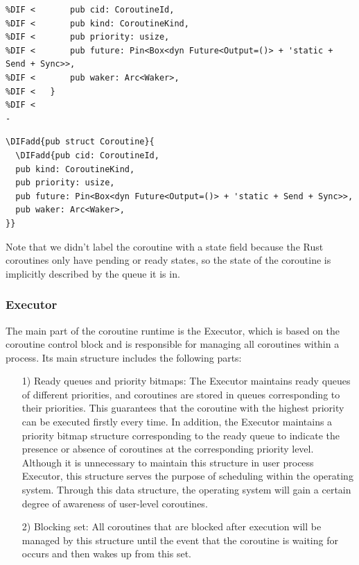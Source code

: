 \documentclass[sigconf,review,anonymous]{acmart}
\providecommand{\DIFadd}[1]{{\protect\color{blue}\uwave{#1}}} %
\providecommand{\DIFaddbegin}{} %
\providecommand{\DIFaddend}{} %
\providecommand{\DIFdelbegin}{} %
\providecommand{\DIFdelend}{} %
\providecommand{\DIFmodbegin}{} %
\providecommand{\DIFmodend}{} %
\begin{document}
\DIFdelbegin %
\DIFmodbegin
\begin{lstlisting}[label={ccb},caption={Coroutine control block},alsolanguage=DIFcode]
%DIF <   pub struct Coroutine{
%DIF <       pub cid: CoroutineId,
%DIF <       pub kind: CoroutineKind,
%DIF <       pub priority: usize,
%DIF <       pub future: Pin<Box<dyn Future<Output=()> + 'static + Send + Sync>>, 
%DIF <       pub waker: Arc<Waker>,
%DIF <   }
%DIF <   
-\end{lstlisting}
\DIFmodend %
\DIFdelend \DIFaddbegin \begin{listing}
\caption{\DIFadd{Coroutine control block.}}
\label{ccb}
\begin{mdframed}
\begin{verbatim}
\DIFadd{pub struct Coroutine}{
  \DIFadd{pub cid: CoroutineId,
  pub kind: CoroutineKind,
  pub priority: usize,
  pub future: Pin<Box<dyn Future<Output=()> + 'static + Send + Sync>>, 
  pub waker: Arc<Waker>,
}}
\end{verbatim}
\end{mdframed}
\end{listing}
\DIFaddend 

Note that we didn't label the coroutine with a state field because the Rust coroutines only have pending or ready states, so the state of the coroutine is implicitly described by the queue it is in.

\subsubsection{Executor}
\label{subsubsection: executor}

The main part of the coroutine runtime is the Executor, which is based on the coroutine control block and is responsible for managing all coroutines within a process. Its main structure includes the following parts:

\begin{itemize}[leftmargin=*]
    \item[1)] Ready queues and priority bitmaps: The Executor maintains ready queues of different priorities, and coroutines are stored in queues corresponding to their priorities. This guarantees that the coroutine with the highest priority can be executed firstly every time. In addition, the Executor maintains a priority bitmap structure corresponding to the ready queue to indicate the presence or absence of coroutines at the corresponding priority level. Although it is unnecessary to maintain this structure in user process Executor, this structure serves the purpose of scheduling within the operating system. Through this data structure, the operating system will gain a certain degree of awareness of user-level coroutines.
    \item[2)] Blocking set: All coroutines that are blocked after execution will be managed by this structure until the event that the coroutine is waiting for occurs and then wakes up from this set.
\end{itemize}
\end{document}
